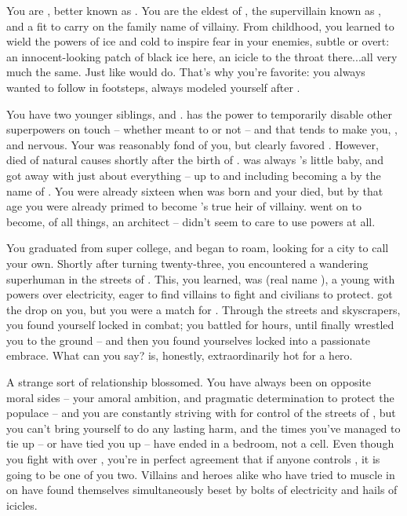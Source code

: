 \documentclass[char]{LRSguildcamp1}
\begin{document}
\name{\cOldest{}}

You are \cOldest{\intro}, better known as \cOldest{\MYsupername}.  You are the eldest \cOldest{\offspring} of \cGrandma{\intro}, the supervillain known as \cGrandma{\MYsupername}, and a \cOldest{\offspring} fit to carry on the family name of villainy.  
From childhood, you learned to wield the powers of ice and cold to inspire fear in your enemies, subtle or overt: an innocent-looking patch of black ice here, an icicle to the throat there...all very much the same. 
Just like \cGrandma{} would do.  That's why you're \cGrandma{\their} favorite: you always wanted to follow in \cGrandma{\their} footsteps, always modeled yourself after \cGrandma{\them}. %

You have two younger siblings, \cArchitect{} and \cYoungest{}.  \cArchitect{} has the power to temporarily disable other superpowers on touch -- whether \cArchitect{\they} meant to or not -- and that tends to make you, \cYoungest{}, and \cGrandma{} nervous.  Your \cGS{\parent} \cGS{\intro} was reasonably fond of you, but clearly favored \cArchitect{}.  However, \cGS{} died of natural causes shortly after the birth of \cYoungest{}. \cYoungest{} was always \cGrandma{}'s little baby, and got away with just about everything -- up to and including becoming a \cYoungest{\hero} by the name of \cYoungest{\MYsupername}.  You were already sixteen when \cYoungest{} was born and your \cGS{\parent} died, but by that age you were already primed to become \cGrandma{}'s true heir of villainy.  \cArchitect{} went on to become, of all things, an architect -- \cArchitect{\they} didn't seem to care to use \cArchitect{\their} powers at all.

You graduated from super college, and began to roam, looking for a city to call your own.  Shortly after turning twenty-three, you encountered a wandering superhuman in the streets of \pCityO{}.  This, you learned, was \cOS{\MYsupername} (real name \cOS{\intro}), a young \cOS{\hero} with powers over electricity, eager to find villains to fight and civilians to protect.  \cOS{\They} got the drop on you, but you were a match for \cOS{\them}.   Through the streets and skyscrapers, you found yourself locked in combat; you battled for hours, until \cOS{\they} finally wrestled you to the ground -- and then you found yourselves locked into a passionate embrace.  What can you say?  \cOS{} is, honestly, extraordinarily hot for a hero.

A strange sort of relationship blossomed.  You have always been on opposite moral sides -- your amoral ambition, and \cOS{\their} pragmatic determination to protect the populace -- and you are constantly striving with \cOS{\them} for control of the streets of \pCityO{}, but you can't bring yourself to do \cOS{\them} any lasting harm, and the times you've managed to tie \cOS{\them} up -- or \cOS{\they} have tied you up -- have ended in a bedroom, not a cell.
Even though you fight with \cOS{} over \pCityO{}, you're in perfect agreement that if anyone controls \pCityO{}, it is going to be one of you two.  Villains and heroes alike who have tried to muscle in on \pCityO{} have found themselves simultaneously beset by bolts of electricity and hails of icicles.
\end{document}
